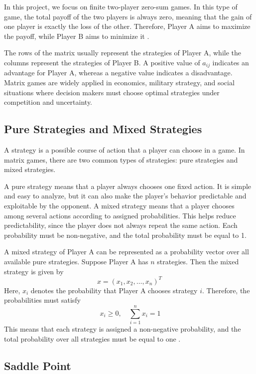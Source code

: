 \documentclass[12pt,a4paper]{article}
\begin{document}
In this project, we focus on finite two-player zero-sum games. In this type of game, the total payoff of the two players is always zero, meaning that the gain of one player is exactly the loss of the other. Therefore, Player A aims to maximize the payoff, while Player B aims to minimize it \cite{osborne2004}.

The rows of the matrix usually represent the strategies of Player A, while the columns represent the strategies of Player B. A positive value of \(a_{ij}\) indicates an advantage for Player A, whereas a negative value indicates a disadvantage. Matrix games are widely applied in economics, military strategy, and social situations where decision makers must choose optimal strategies under competition and uncertainty.

\subsection{Pure Strategies and Mixed Strategies}

A strategy is a possible course of action that a player can choose in a game. In matrix games, there are two common types of strategies: pure strategies and mixed strategies.

A pure strategy means that a player always chooses one fixed action. It is simple and easy to analyze, but it can also make the player's behavior predictable and exploitable by the opponent. A mixed strategy means that a player chooses among several actions according to assigned probabilities. This helps reduce predictability, since the player does not always repeat the same action. Each probability must be non-negative, and the total probability must be equal to 1.

A mixed strategy of Player A can be represented as a probability vector over all available pure strategies. Suppose Player A has \(n\) strategies. Then the mixed strategy is given by
\[
x = (x_1, x_2, \dots, x_n)^T
\]
Here, \(x_i\) denotes the probability that Player A chooses strategy \(i\). Therefore, the probabilities must satisfy
\[
\ x_i \ge 0, \quad \sum_{i=1}^{n} x_i = 1
\]
\vspace{0.1cm}
This means that each strategy is assigned a non-negative probability, and the total probability over all strategies must be equal to one \cite{karlin1959}.


\subsection{Saddle Point}
\end{document}
